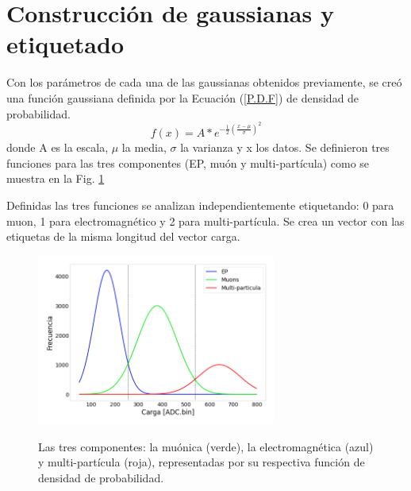 


\section{Construcción de gaussianas y etiquetado}

Con los parámetros de cada una de las gaussianas obtenidos previamente, se creó una función gaussiana definida por la Ecuación (\ref{P.D.F}) de densidad de probabilidad.
\begin{equation}
f(x)=A*e^{-\frac{1}{2}(\frac{x-\mu}{\sigma})^2}
\label{P.D.F}
\end{equation}
donde A es la escala, $\mu$ la media, $\sigma$ la varianza y x los datos. Se definieron tres funciones para las tres componentes (EP, muón y multi-partícula) como se muestra en la Fig. \ref{cinco}


Definidas las tres funciones se analizan independientemente etiquetando: 0 para muon, 1 para electromagnético y 2 para multi-partícula. Se crea un vector con las etiquetas de la misma longitud del vector carga.

\begin{figure}[h!]
\centering
\begin{center}
\caption{ Las tres componentes: la muónica (verde),  la electromagnética (azul) y multi-partícula (roja), representadas por su respectiva función de densidad de probabilidad.}
\includegraphics[width=0.7\textwidth]{Figures/imagenes/5.png}
\label{cinco}
\end{center}
\end{figure}
